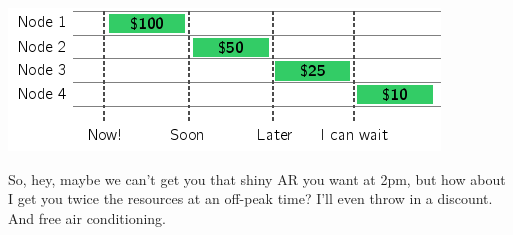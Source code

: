 \begin{center}
\includegraphics{images/lease_negotiate.png}
\end{center}


So, hey, maybe we can't get you that shiny AR you want at 2pm, but how about I get you twice the resources at an off-peak time? I'll even throw in a discount. And free air conditioning.